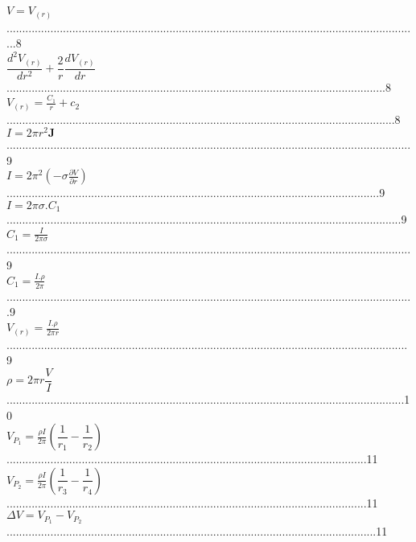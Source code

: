 $\textit{V}=\textit{V}_{(\textit{r})}$....................................................................................................................................8\\
$\dfrac{{d^2}\textit{V}_{(\textit{r})}}{dr^2}+\dfrac{2}{r}\dfrac{{d}\textit{V}_{(\textit{r})}}{dr}$.........................................................................................................................8\\
$\textit{V}_{(\textit{r})}=\frac{C_{1}}{r}+c_{2}$............................................................................................................................8\\
$\textit{I}=2{\pi}r^2\textbf{J}$.................................................................................................................................9\\
$\textit{I}=2{\pi}^2(-\sigma\frac{{\partial}V}{{\partial}r})$.......................................................................................................................9\\
$\textit{I}=2{\pi}\sigma.C_{1}$..............................................................................................................................9\\
$C_{1}=\frac{I}{2\pi\sigma}$.................................................................................................................................9\\
$C_{1}=\frac{I.\rho}{{2}\pi}$..................................................................................................................................9\\
$\textit{V}_{(\textit{r})}=\frac{I.\rho}{{{{2}\pi}r}}$................................................................................................................................9\\
$\rho={{{{2}\pi}r}\dfrac{V}{I}}$...............................................................................................................................10\\
$V_{P_{1}}=\frac{\rho I}{2 \pi}(\dfrac{1}{r_{1}}-\dfrac{1}{r_{2}})$...................................................................................................................11\\
$V_{P_{2}}=\frac{\rho I}{2 \pi}(\dfrac{1}{r_{3}}-\dfrac{1}{r_{4}})$...................................................................................................................11\
$\Delta V=V_{P_{1}}-V_{P_{2}}$......................................................................................................................11\\
